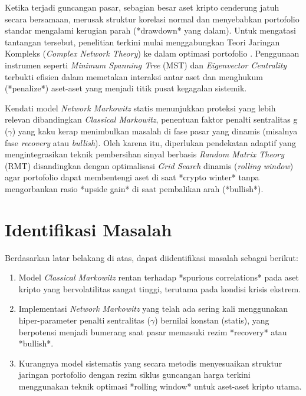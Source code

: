 \documentclass[12pt, a4paper]{report}
\begin{document}
Ketika terjadi guncangan pasar, sebagian besar aset kripto cenderung jatuh secara bersamaan, merusak struktur korelasi normal dan menyebabkan portofolio standar mengalami kerugian parah (*drawdown* yang dalam). Untuk mengatasi tantangan tersebut, penelitian terkini mulai menggabungkan Teori Jaringan Kompleks (\textit{Complex Network Theory}) ke dalam optimasi portofolio \cite{ref2}. Penggunaan instrumen seperti \textit{Minimum Spanning Tree} (MST) dan \textit{Eigenvector Centrality} terbukti efisien dalam memetakan interaksi antar aset dan menghukum (*penalize*) aset-aset yang menjadi titik pusat kegagalan sistemik. 

Kendati model \textit{Network Markowitz} statis menunjukkan proteksi yang lebih relevan dibandingkan \textit{Classical Markowitz}, penentuan faktor penalti sentralitas g ($\gamma$) yang kaku kerap menimbulkan masalah di fase pasar yang dinamis (misalnya fase \textit{recovery} atau \textit{bullish}). Oleh karena itu, diperlukan pendekatan adaptif yang mengintegrasikan teknik pembersihan sinyal berbasis \textit{Random Matrix Theory} (RMT) disandingkan dengan optimalisasi \textit{Grid Search} dinamis (\textit{rolling window}) agar portofolio dapat membentengi aset di saat *crypto winter* tanpa mengorbankan rasio *upside gain* di saat pembalikan arah (*bullish*).

\section{Identifikasi Masalah}

Berdasarkan latar belakang di atas, dapat diidentifikasi masalah sebagai berikut:
\begin{enumerate}[label=\alph*.]
    \item Model \textit{Classical Markowitz} rentan terhadap *spurious correlations* pada aset kripto yang bervolatilitas sangat tinggi, terutama pada kondisi krisis ekstrem.
    \item Implementasi \textit{Network Markowitz} yang telah ada sering kali menggunakan hiper-parameter penalti sentralitas ($\gamma$) bernilai konstan (statis), yang berpotensi menjadi bumerang saat pasar memasuki rezim *recovery* atau *bullish*.
    \item Kurangnya model sistematis yang secara metodis menyesuaikan struktur jaringan portofolio dengan rezim siklus guncangan harga terkini menggunakan teknik optimasi *rolling window* untuk aset-aset kripto utama.
\end{enumerate}
\end{document}
